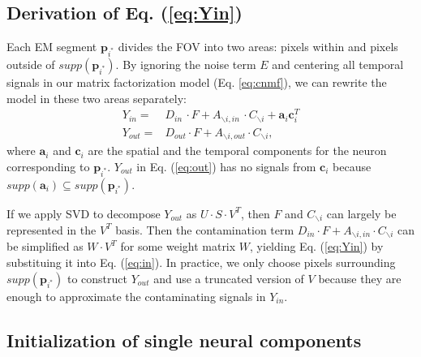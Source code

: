 \documentclass[10pt,letterpaper]{article}
\begin{document}
{\begin{algorithm}[t!]
\begin{algorithmic}[1]
\end{algorithmic}

\end{algorithm}
\subsection{Derivation of Eq. (\ref{eq:Yin})} \label{sec:derivation}

Each EM segment $\bm{p}_{i^*}$ divides the FOV into two areas: pixels within and pixels outside of $supp(\bm{p}_{i^*})$. By ignoring the noise term $E$  and centering all temporal signals in our matrix factorization model (Eq. \ref{eq:cnmf}), we can rewrite the model in these two areas separately: 
\begin{align}
    Y_{in} = &D_{in~}\cdot F + A_{\backslash i,in~}\cdot C_{\backslash i} + \bm{a}_i\bm{c}_i^T \label{eq:in}\\
    Y_{out} = &D_{out}\cdot F+ A_{\backslash i,out} \cdot C_{\backslash i}, \label{eq:out}
\end{align}
where $\bm{a}_i$ and $\bm{c}_i$ are the spatial and  the temporal components for the neuron corresponding to $\bm{p}_{i^*}$. $Y_{out}$ in Eq. (\ref{eq:out}) has no signals from $\bm{c}_i$ because $supp(\bm{a}_i)\subseteq supp(\bm{p}_{i^*})$. 

If we apply SVD to decompose $Y_{out}$ as $U\cdot S\cdot V^T$, then $F$ and $C_{\backslash i}$ can largely be represented in the $V^T$ basis. 
Then the contamination term $D_{in}\cdot F + A_{\backslash i,in}\cdot C_{\backslash i}$ can be simplified as $W\cdot V^T$ for some weight matrix $W$, yielding Eq. (\ref{eq:Yin}) by substituing it into Eq. (\ref{eq:in}). In practice, we only choose pixels surrounding $supp(\bm{p}_{i^*})$ to construct $Y_{out}$ and use a truncated version of $V$ because they are enough to approximate the contaminating signals in $Y_{in}$. 


\subsection{Initialization of single neural components}

}
\end{document}
